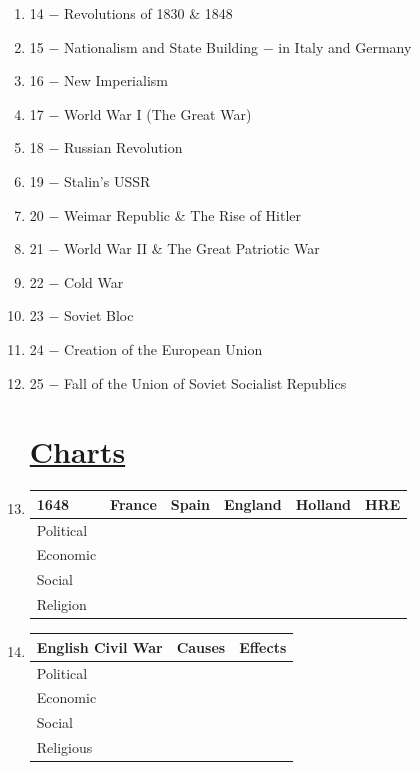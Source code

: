 \documentclass[12pt]{article}
\begin{document}
\begin{enumerate}
\item 14 $-$ Revolutions of 1830 \& 1848

\item 15 $-$ Nationalism and State Building $-$ in Italy and Germany

\item 16 $-$ New Imperialism

\item 17 $-$ World War I (The Great War)

\item 18 $-$ Russian Revolution

\item 19 $-$ Stalin's USSR

\item 20 $-$ Weimar Republic \& The Rise of Hitler

\item 21 $-$ World War II \& The Great Patriotic War

\item 22 $-$ Cold War

\item 23 $-$ Soviet Bloc

\item 24 $-$ Creation of the European Union

\item 25 $-$ Fall of the Union of Soviet Socialist Republics

\section{\underline{Charts}}

\item \begin{tabular}{|l|l|l|l|l|l|}

\hline
1648 & France & Spain & England & Holland & HRE \\
\hline
Political & & & & & \\
\hline
Economic & & & & & \\
\hline
Social & & & & & \\
\hline
Religion & & & & & \\
\hline


\end{tabular}

\item \begin{tabular}{|l|l|l|}

\hline
English Civil War & Causes & Effects \\
\hline
Political & & \\
\hline
Economic & & \\
\hline
Social & & \\
\hline
Religious & & \\
\hline


\end{tabular}
\end{enumerate}
\end{document}

